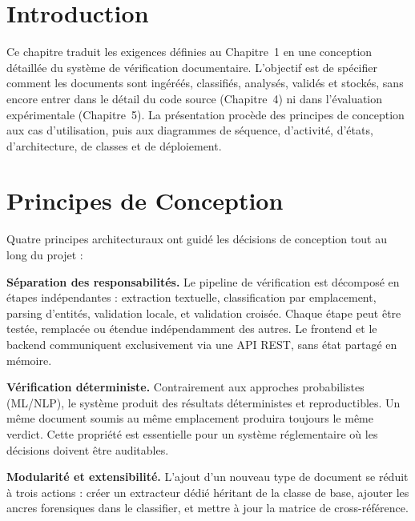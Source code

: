 
\section*{Introduction}

Ce chapitre traduit les exigences d\'{e}finies au Chapitre~1 en une conception d\'{e}taill\'{e}e du syst\`{e}me de v\'{e}rification documentaire. L'objectif est de sp\'{e}cifier comment les documents sont ingéré\'{e}s, classifi\'{e}s, analys\'{e}s, valid\'{e}s et stock\'{e}s, sans encore entrer dans le d\'{e}tail du code source (Chapitre~4) ni dans l'\'{e}valuation exp\'{e}rimentale (Chapitre~5). La pr\'{e}sentation proc\`{e}de des principes de conception aux cas d'utilisation, puis aux diagrammes de s\'{e}quence, d'activit\'{e}, d'\'{e}tats, d'architecture, de classes et de d\'{e}ploiement.

\section{Principes de Conception}

Quatre principes architecturaux ont guid\'{e} les d\'{e}cisions de conception tout au long du projet :

\textbf{S\'{e}paration des responsabilit\'{e}s.} Le pipeline de v\'{e}rification est d\'{e}compos\'{e} en \'{e}tapes ind\'{e}pendantes : extraction textuelle, classification par emplacement, parsing d'entit\'{e}s, validation locale, et validation crois\'{e}e. Chaque \'{e}tape peut \^{e}tre test\'{e}e, remplac\'{e}e ou \'{e}tendue ind\'{e}pendamment des autres. Le frontend et le backend communiquent exclusivement via une API REST, sans \'{e}tat partag\'{e} en m\'{e}moire.

\textbf{V\'{e}rification d\'{e}terministe.} Contrairement aux approches probabilistes (ML/NLP), le syst\`{e}me produit des r\'{e}sultats d\'{e}terministes et reproductibles. Un m\^{e}me document soumis au m\^{e}me emplacement produira toujours le m\^{e}me verdict. Cette propri\'{e}t\'{e} est essentielle pour un syst\`{e}me r\'{e}glementaire o\`{u} les d\'{e}cisions doivent \^{e}tre auditables.

\textbf{Modularit\'{e} et extensibilit\'{e}.} L'ajout d'un nouveau type de document se r\'{e}duit \`{a} trois actions : cr\'{e}er un extracteur d\'{e}di\'{e} h\'{e}ritant de la classe de base, ajouter les ancres forensiques dans le classifier, et mettre \`{a} jour la matrice de cross-r\'{e}f\'{e}rence.

